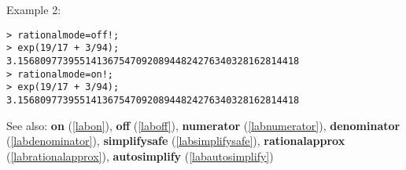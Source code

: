 \noindent Example 2: 
\begin{center}\begin{minipage}{15cm}\begin{Verbatim}[frame=single]
> rationalmode=off!;
> exp(19/17 + 3/94);
3.15680977395514136754709208944824276340328162814418
> rationalmode=on!;
> exp(19/17 + 3/94);
3.15680977395514136754709208944824276340328162814418
\end{Verbatim}
\end{minipage}\end{center}
See also: \textbf{on} (\ref{labon}), \textbf{off} (\ref{laboff}), \textbf{numerator} (\ref{labnumerator}), \textbf{denominator} (\ref{labdenominator}), \textbf{simplifysafe} (\ref{labsimplifysafe}), \textbf{rationalapprox} (\ref{labrationalapprox}), \textbf{autosimplify} (\ref{labautosimplify})
